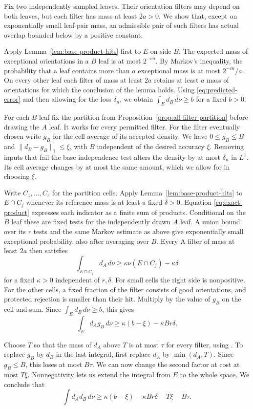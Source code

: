 Fix two independently sampled leaves. Their orientation filters may depend
on both leaves, but each filter has mass at least \(2a>0\). We show that,
except on exponentially small leaf-pair mass, an admissible pair of such
filters has actual overlap bounded below by a positive constant.

Apply Lemma~\ref{lem:base-product-hits} first to \(E\) on side \(B\).
The expected mass of exceptional orientations in a \(B\) leaf is at
most \(2^{-cn}\). By Markov's inequality, the probability that a leaf
contains more than \(a\) exceptional mass is at most \(2^{-cn}/a\).
On every other leaf each filter of mass at least \(2a\) retains at
least \(a\) mass of orientations for which the conclusion of the lemma
holds. Using \eqref{eq:predicted-error} and then allowing for the loss
\(\delta_n\), we obtain \(\int_Ed_B\,d\nu\ge b\) for a fixed \(b>0\).

For each \(B\) leaf fix the partition from
Proposition~\ref{prop:all-filter-partition} before drawing the \(A\)
leaf. It works for every permitted filter. For the filter eventually
chosen write \(g_B\) for the cell average of its accepted density.
We have \(0\le g_B\le B\) and \(\|d_B-g_B\|_1\le\xi\), with \(B\)
independent of the desired accuracy \(\xi\). Removing inputs that fail
the base independence test alters the density by at most \(\delta_n\)
in \(L^1\). Its cell average changes by at most the same amount, which
we allow for in choosing \(\xi\).

Write \(C_1,\ldots,C_r\) for the partition cells. Apply
Lemma~\ref{lem:base-product-hits} to \(E\cap C_j\) whenever its reference
mass is at least a fixed \(\delta>0\). Equation \eqref{eq:exact-product} expresses each indicator as
a finite sum of products. Conditional on the \(B\) leaf these are
fixed tests for the independently drawn \(A\) leaf. A union bound over
its \(r\) tests and the same Markov estimate as above give exponentially
small exceptional probability, also after averaging over \(B\). Every A filter of mass
at least \(2a\) then satisfies
\[
 \int_{E\cap C_j}d_A\,d\nu
 \ge\kappa\nu(E\cap C_j)-\kappa\delta
\]
for a fixed \(\kappa>0\) independent of \(r,\delta\). For small cells
the right side is nonpositive. For the other cells, a fixed fraction of
the filter consists of good orientations, and protected rejection is
smaller than their hit. Multiply by the value of \(g_B\) on the cell
and sum. Since \(\int_E d_B\,d\nu\ge b\), this gives
\[
 \int_E d_Ag_B\,d\nu\ge\kappa(b-\xi)-\kappa Br\delta.
\]

Choose \(T\) so that the mass of \(d_A\) above \(T\) is at most
\(\tau\) for every filter, using .
To replace \(g_B\) by \(d_B\) in the last integral, first replace
\(d_A\) by \(\min(d_A,T)\). Since \(g_B\le B\), this loses at most
\(B\tau\). We can now change the second factor at cost at most \(T\xi\).
Nonnegativity lets us extend the integral from \(E\) to the whole space.
We conclude that
\begin{equation}\label{eq:predicted-pair-overlap}
 \int d_Ad_B\,d\nu
 \ge\kappa(b-\xi)-\kappa Br\delta-T\xi-B\tau.
\end{equation}

